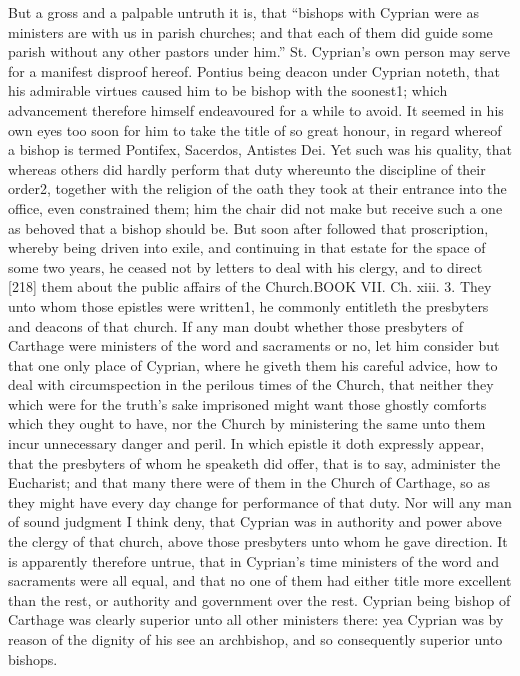 But a gross and a palpable untruth it is, that “bishops with Cyprian were as ministers are with us in parish churches; and that each of them did guide some parish without any other pastors under him.” St. Cyprian’s own person may serve for a manifest disproof hereof. Pontius being deacon under Cyprian noteth, that his admirable virtues caused him to be bishop with the soonest1; which advancement therefore himself endeavoured for a while to avoid. It seemed in his own eyes too soon for him to take the title of so great honour, in regard whereof a bishop is termed Pontifex, Sacerdos, Antistes Dei. Yet such was his quality, that whereas others did hardly perform that duty whereunto the discipline of their order2, together with the religion of the oath they took at their entrance into the office, even constrained them; him the chair did not make but receive such a one as behoved that a bishop should be. But soon after followed that proscription, whereby being driven into exile, and continuing in that estate for the space of some two years, he ceased not by letters to deal with his clergy, and to direct [218] them about the public affairs of the Church.BOOK VII. Ch. xiii. 3. They unto whom those epistles were written1, he commonly entitleth the presbyters and deacons of that church. If any man doubt whether those presbyters of Carthage were ministers of the word and sacraments or no, let him consider but that one only place of Cyprian, where he giveth them his careful advice, how to deal with circumspection in the perilous times of the Church, that neither they which were for the truth’s sake imprisoned might want those ghostly comforts which they ought to have, nor the Church by ministering the same unto them incur unnecessary danger and peril. In which epistle it doth expressly appear, that the presbyters of whom he speaketh did offer, that is to say, administer the Eucharist; and that many there were of them in the Church of Carthage, so as they might have every day change for performance of that duty. Nor will any man of sound judgment I think deny, that Cyprian was in authority and power above the clergy of that church, above those presbyters unto whom he gave direction. It is apparently therefore untrue, that in Cyprian’s time ministers of the word and sacraments were all equal, and that no one of them had either title more excellent than the rest, or authority and government over the rest. Cyprian being bishop of Carthage was clearly superior unto all other ministers there: yea Cyprian was by reason of the dignity of his see an archbishop, and so consequently superior unto bishops.

